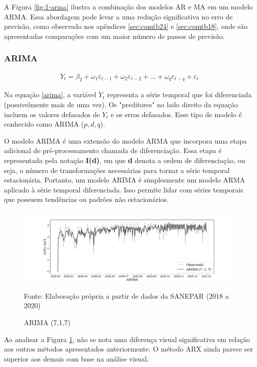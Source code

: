 A Figura \ref{fig:1-arma} ilustra a combinação dos modelos AR e MA em um modelo ARMA. Essa abordagem pode levar a uma redução significativa no erro de previsão, como observado nos apêndices \ref{sec:comtb24} e \ref{sec:comtb18}, onde são apresentadas comparações com um maior número de passos de previsão.

\subsubsection{ARIMA}

\begin{eqnarray}
	Y_t = \beta_2 + \omega_1\varepsilon_{t-1} + \omega_2 \varepsilon_{t-2} +\ldots+ \omega_q \varepsilon_{t-q} + \varepsilon_t \label{arima}
\end{eqnarray}

Na equação \eqref{arima}, a variável $Y_t$ representa a série temporal que foi diferenciada (possivelmente mais de uma vez). Os "preditores" no lado direito da equação incluem os valores defasados de $Y_t$ e os erros defasados. Esse tipo de modelo é conhecido como ARIMA ($p, d, q$).

O modelo ARIMA é uma extensão do modelo ARMA que incorpora uma etapa adicional de pré-processamento chamada de diferenciação. Essa etapa é representada pela notação \textbf{I(d)}, em que \textbf{d} denota a ordem de diferenciação, ou seja, o número de transformações necessárias para tornar a série temporal estacionária. Portanto, um modelo ARIMA é simplesmente um modelo ARMA aplicado à série temporal diferenciada. Isso permite lidar com séries temporais que possuem tendências ou padrões não estacionários.

\begin{figure}[H]
	\centering
	\caption{ARIMA (7,1,7)}
	\label{fig:1-arima}
	\includegraphics[width=1\linewidth]{Modelos/Figuras/ARIMA}
	
	Fonte: Elaboração própria a partir de dados da SANEPAR (2018 a 2020)
\end{figure}

Ao analisar a Figura \ref{fig:1-arima}, não se nota uma diferença visual significativa em relação aos outros métodos apresentados anteriormente. O método ARX ainda parece ser superior aos demais com base na análise visual.

